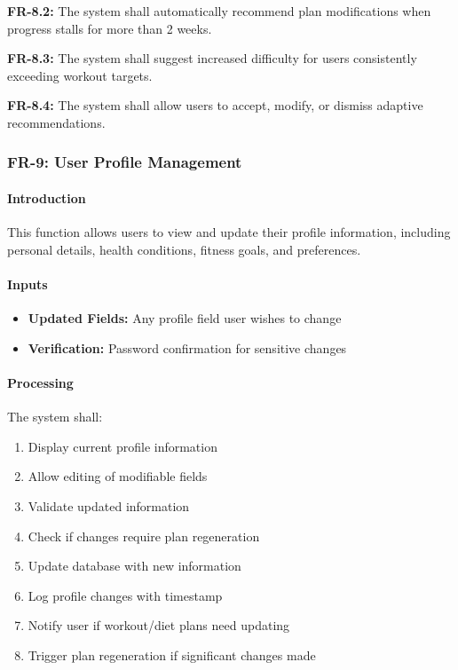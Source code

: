\documentclass[12pt,a4paper]{article}
\begin{document}
\textbf{FR-8.2:} The system shall automatically recommend plan modifications when progress stalls for more than 2 weeks.

\textbf{FR-8.3:} The system shall suggest increased difficulty for users consistently exceeding workout targets.

\textbf{FR-8.4:} The system shall allow users to accept, modify, or dismiss adaptive recommendations.

\subsubsection{FR-9: User Profile Management}

\paragraph{Introduction}
This function allows users to view and update their profile information, including personal details, health conditions, fitness goals, and preferences.

\paragraph{Inputs}
\begin{itemize}
    \item \textbf{Updated Fields:} Any profile field user wishes to change
    \item \textbf{Verification:} Password confirmation for sensitive changes
\end{itemize}

\paragraph{Processing}
The system shall:
\begin{enumerate}
    \item Display current profile information
    \item Allow editing of modifiable fields
    \item Validate updated information
    \item Check if changes require plan regeneration
    \item Update database with new information
    \item Log profile changes with timestamp
    \item Notify user if workout/diet plans need updating
    \item Trigger plan regeneration if significant changes made
\end{enumerate}
\end{document}
